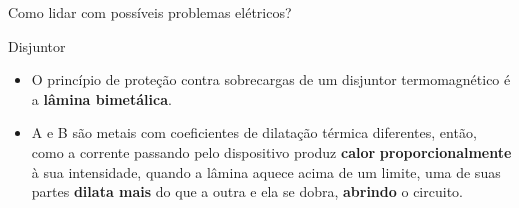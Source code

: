 \begin{frame}{Como lidar com possíveis problemas elétricos?}
\begin{block}{Disjuntor}
	\begin{itemize}
		\item O princípio de proteção contra sobrecargas de um disjuntor termomagnético é a \textbf{lâmina bimetálica}.
	\end{itemize}
\end{block}
	\begin{center}
	\end{center}
\begin{block}{}
	\begin{itemize}
		\item A e B são metais com coeficientes de dilatação térmica diferentes, então, como a corrente passando pelo dispositivo produz \textbf{calor} \textbf{proporcionalmente} à sua intensidade, quando a lâmina aquece acima de um limite, uma de suas partes \textbf{dilata mais} do que a outra e ela se dobra, \textbf{abrindo} o circuito.
	\end{itemize}
\end{block}
\end{frame}

